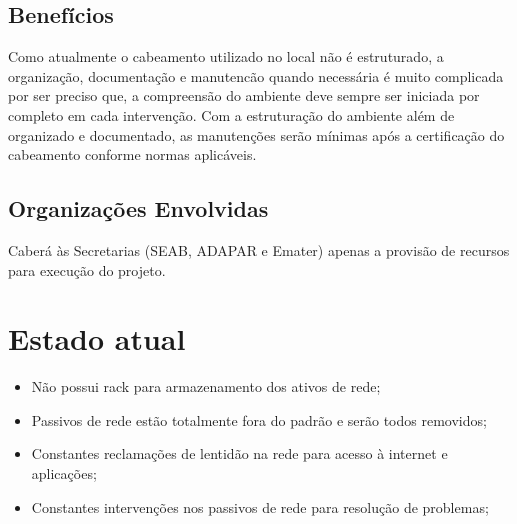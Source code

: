 \documentclass[	DIV=calc,%
							paper=a4,%
							fontsize=12pt,%
							onecolumn]{scrartcl}	 					%
\begin{document}

\subsection{Benefícios}
Como atualmente o cabeamento utilizado no local não é estruturado, a organização, documentação e  manutencão quando necessária é muito complicada por ser preciso que, a compreensão do ambiente deve sempre ser iniciada por completo em cada intervenção. Com a estruturação do ambiente além de organizado e documentado, as manutenções serão mínimas após a certificação do cabeamento conforme normas aplicáveis.


\subsection{Organizações Envolvidas}
Caberá às Secretarias (SEAB, ADAPAR e Emater) apenas a provisão de recursos para execução do projeto. 




\section{Estado atual}

\begin{itemize}
	\item Não possui rack para armazenamento dos ativos de rede;
	\item Passivos de rede estão totalmente fora do padrão e serão todos removidos;
	\item Constantes reclamações de lentidão na rede para acesso à internet e aplicações;
	\item Constantes intervenções nos passivos de rede para resolução de problemas;
\end{itemize}
\end{document}
